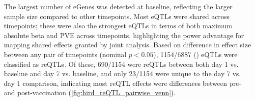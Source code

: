 The largest number of eGenes was detected at baseline, reflecting the larger sample size compared to other timepoints.
Most \glspl{eQTL} were shared across timepoints; 
these were also the strongest \glspl{eQTL} in terms of both maximum absolute beta and \gls{PVE} across timepoints, highlighting the power advantage for mapping shared effects granted by joint analysis.
Based on difference in effect size between any pair of timepoints (nominal $p < 0.05$),
\num{1154/6887} () \glspl{eQTL} were classified as \glspl{reQTL}.
Of these, 
\num{690/1154} were \glspl{reQTL} between both day 1 vs. baseline and day 7 vs. baseline, 
and only \num{23/1154} were unique to the day 7 vs. day 1 comparison, 
indicating most \gls{reQTL} effects were differences between pre- and post-vaccination (\cref{fig:hird_reQTL_pairwise_venn}).


